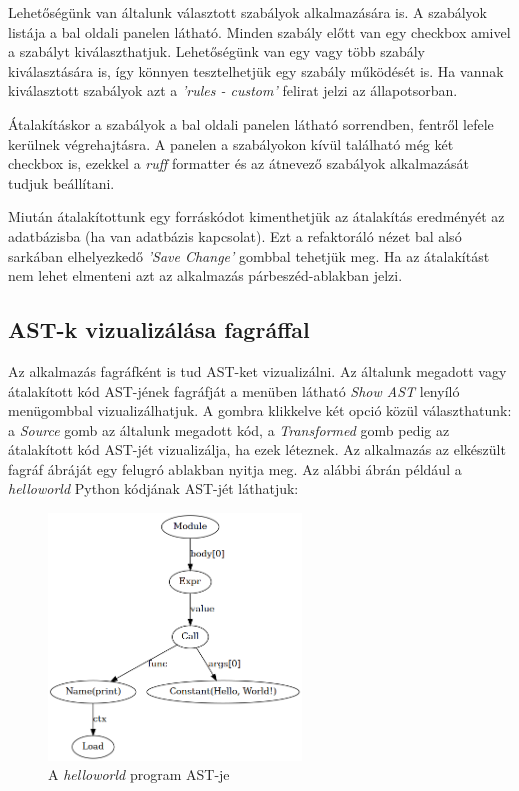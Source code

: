 Lehetőségünk van általunk választott szabályok alkalmazására is.
A szabályok listája a bal oldali panelen látható. Minden szabály előtt van egy checkbox
amivel a szabályt kiválaszthatjuk. Lehetőségünk van egy vagy több szabály kiválasztására is,
így könnyen tesztelhetjük egy szabály működését is.
Ha vannak kiválasztott szabályok azt a \emph{'rules - custom'} felirat jelzi az állapotsorban.

Átalakításkor a szabályok a bal oldali panelen látható sorrendben, fentről lefele kerülnek végrehajtásra.
A panelen a szabályokon kívül található még két checkbox is,
ezekkel a \emph{ruff} formatter és az átnevező szabályok alkalmazását tudjuk beállítani.

Miután átalakítottunk egy forráskódot kimenthetjük az átalakítás eredményét az adatbázisba
(ha van adatbázis kapcsolat).
Ezt a refaktoráló nézet bal alsó sarkában elhelyezkedő \emph{'Save Change'} gombbal tehetjük meg.
Ha az átalakítást nem lehet elmenteni azt az alkalmazás párbeszéd-ablakban jelzi.

\subsection{AST-k vizualizálása fagráffal}

Az alkalmazás fagráfként is tud AST-ket vizualizálni.
Az általunk megadott vagy átalakított kód AST-jének fagráfját a menüben látható
\emph{Show AST} lenyíló menügombbal vizualizálhatjuk.
A gombra klikkelve két opció közül választhatunk:
a \emph{Source} gomb az általunk megadott kód, a \emph{Transformed} gomb pedig az átalakított kód
AST-jét vizualizálja, ha ezek léteznek.
Az alkalmazás az elkészült fagráf ábráját egy felugró ablakban nyitja meg.
Az alábbi ábrán például a \emph{helloworld} Python kódjának AST-jét láthatjuk:

\begin{figure}[H]
	\centering
	\includegraphics[width=0.6\textwidth]{images/figs/ast_graph.png}
	\caption{A \emph{helloworld} program AST-je}
\end{figure}

